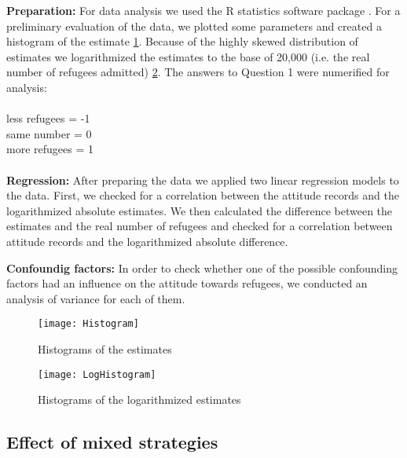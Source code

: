 \textbf{Preparation:} For data analysis we used the R statistics software package \citep{RCoreTeam2014}. For a preliminary evaluation of the data, we plotted some parameters and created a histogram of the estimate \ref{fig: Histogram1}. Because of the highly skewed distribution of estimates we logarithmized the estimates to the base of 20,000 (i.e. the real number of refugees admitted) \ref{fig: Histogram2}.
The answers to Question 1 were numerified for analysis: \\
\\
\indent\indent less refugees = -1\\
\indent\indent same number = 0\\
\indent\indent more refugees = 1\\
\\
\textbf{Regression:} After preparing the data we applied two linear regression models to the data. First, we checked for a correlation between the attitude records and the logarithmized absolute estimates. We then calculated the difference between the estimates and the real number of refugees and checked for a correlation between attitude records and the logarithmized absolute difference.


\noindent\textbf{Confoundig factors:} In order to check whether one of the possible confounding factors had an influence on the attitude towards refugees, we conducted an analysis of variance for each of them.



\begin{figure}[H]
	\centering 
	\texttt{[image: Histogram]}
	\caption{Histograms of the estimates}\label{fig: Histogram1}
\end{figure}

\begin{figure}[H]
	\centering 
	\texttt{[image: LogHistogram]}
	\caption{Histograms of the logarithmized estimates}\label{fig: Histogram2}
\end{figure}




\subsection{Effect of mixed strategies}



